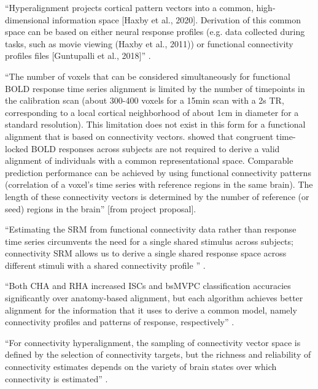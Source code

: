 
``Hyperalignment projects cortical pattern vectors into a common,
high-dimensional information space [Haxby et al., 2020].
%
Derivation of this common space can be based on either neural response profiles
(e.g. data collected during tasks, such as movie viewing (Haxby et al., 2011))
or functional connectivity profiles files [Guntupalli et al., 2018]''
\citep{busch2021hybrid}.


``The number of voxels that can be considered simultaneously for functional BOLD
response time series alignment is limited by the number of timepoints in the
calibration scan (about 300-400 voxels for a 15min scan with a 2s TR,
corresponding to a local cortical neighborhood of about 1cm in diameter for a
standard resolution).
%
This limitation does not exist in this form for a functional alignment that is
based on connectivity vectors.
%
\citet{kaule2017examination} showed that congruent time-locked BOLD responses
across subjects are not required to derive a valid alignment of individuals with
a common representational space.
%
Comparable prediction performance can be achieved by using functional
connectivity patterns (correlation of a voxel's time series with reference
regions in the same brain).
%
The length of these connectivity vectors is determined by the number of
reference (or seed) regions in the brain'' [from project proposal].

``Estimating the SRM from functional connectivity data rather than
response time series circumvents the need for a single shared stimulus across
subjects; connectivity SRM allows us to derive a single shared response space
across different stimuli with a shared connectivity profile
\citep{nastase2019leveraging}'' \citep{kumar2020brainiak}.


``Both CHA and RHA increased ISCs and bsMVPC classification
accuracies significantly over anatomy-based alignment, but each algorithm
achieves better alignment for the information that it uses to derive a common
model, namely connectivity profiles and patterns of response, respectively''
\citep{guntupalli2018computational}.


``For connectivity hyperalignment, the sampling of connectivity vector space is
defined by the selection of connectivity targets, but the richness and
reliability of connectivity estimates depends on the variety of brain states
over which connectivity is estimated'' \citep{haxby2020hyperalignment}.


